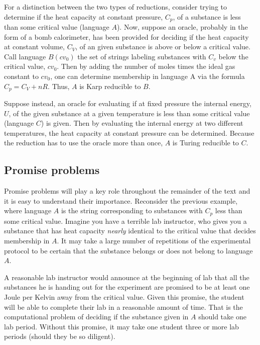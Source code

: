 \documentclass[11pt,oneside,final]{huthesis}%
\begin{document}
For a distinction between the two types of reductions, consider trying to determine if the heat capacity at constant pressure, $C_p$, of a substance is less than some critical value (language $A$).  Now, suppose an oracle, probably in the form of a bomb calorimeter, has been provided for deciding if the heat capacity at constant volume, $C_V$, of an given substance is above or below a critical value.  Call language $B(cv_0)$ the set of strings labeling substances with $C_v$ below the critical value, $cv_0$.  Then by adding the number of moles times the ideal gas constant to $cv_0$, one can determine membership in language A via the formula $C_p=C_V+nR$. Thus, $A$ is Karp reducible to $B$. 

Suppose instead, an oracle for evaluating if at fixed pressure the internal energy, $U$, of the given substance at a given temperature is less than some critical value (language $C$) is given.  Then by evaluating the internal energy at two different temperatures, the heat capacity at constant pressure can be determined.  Because the reduction has to use the oracle more than once, $A$ is Turing reducible to $C$.



\subsection{Promise problems}
Promise problems will play a key role throughout the remainder of the text and it is easy to understand their importance.  Reconsider the previous example, where language $A$ is the string corresponding to substances with $C_p$ less than some critical value. Imagine you have a terrible lab instructor, who gives you a substance that has heat capacity \emph{nearly} identical to the critical value that decides membership in $A$.  It may take a large number of repetitions of the experimental protocol to be certain that the substance belongs or does not belong to language $A$. 

A reasonable lab instructor would announce at the beginning of lab that all the substances he is handing out for the experiment are promised to be at least one Joule per Kelvin away from the critical value.  Given this promise, the student will be able to complete their lab in a reasonable amount of time.  That is the computational problem of deciding if the substance given in $A$ should take one lab period.  Without this promise, it may take one student three or more lab periods (should they be so diligent).
\end{document}
